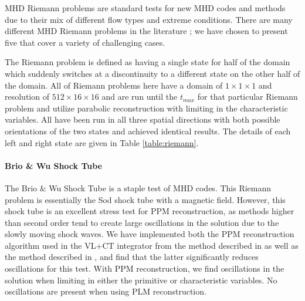 MHD Riemann problems are standard tests for new MHD codes and methods due to their mix of different flow types and extreme conditions. There are many different MHD Riemann problems in the literature \citep{brio_wu_1988, einfeldt_1991, ryu_jones_1995, dai_woodward_1998}; we have chosen to present five that cover a variety of challenging cases. 

The Riemann problem is defined as having a single state for half of the domain which suddenly switches at a discontinuity to a different state on the other half of the domain. All of Riemann problems here have a domain of $1\times1\times1$ and resolution of $512\times16\times16$ and are run until the $t_{max}$ for that particular Riemann problem and utilize parabolic reconstruction with limiting in the characteristic variables. All have been run in all three spatial directions with both possible orientations of the two states and achieved identical results. The details of each left and right state are given in Table \ref{table:riemann}.



\paragraph{Brio \& Wu Shock Tube}

The Brio \& Wu Shock Tube \citep{brio_wu_1988} is a staple test of MHD codes. This Riemann problem is essentially the Sod shock tube \citep{sod_1978} with a magnetic field. However, this shock tube is an excellent stress test for PPM reconstruction, as methods higher than second order tend to create large oscillations in the solution due to the slowly moving shock waves. We have implemented both the PPM reconstruction algorithm used in the VL+CT integrator from the method described in \cite{stone_athena_2008} as well as the method described in \cite{felker_2018}, and find that the latter significantly reduces oscillations for this test. With PPM reconstruction, we find  oscillations in the solution when limiting in either the primitive or characteristic variables. No oscillations are present when using PLM reconstruction.

